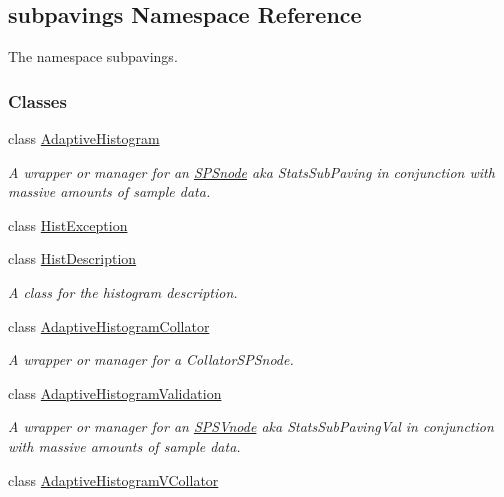 \hypertarget{namespacesubpavings}{\subsection{subpavings \-Namespace \-Reference}
\label{namespacesubpavings}
}


\-The namespace subpavings.  


\subsubsection*{\-Classes}
\begin{DoxyCompactItemize}
\item 
class \hyperlink{classsubpavings_1_1AdaptiveHistogram}{\-Adaptive\-Histogram}
\begin{DoxyCompactList}\small\item\em \-A wrapper or manager for an \hyperlink{classsubpavings_1_1SPSnode}{\-S\-P\-Snode} aka \-Stats\-Sub\-Paving in conjunction with massive amounts of sample data. \end{DoxyCompactList}\item 
class \hyperlink{classsubpavings_1_1HistException}{\-Hist\-Exception}
\item 
class \hyperlink{classsubpavings_1_1HistDescription}{\-Hist\-Description}
\begin{DoxyCompactList}\small\item\em \-A class for the histogram description. \end{DoxyCompactList}\item 
class \hyperlink{classsubpavings_1_1AdaptiveHistogramCollator}{\-Adaptive\-Histogram\-Collator}
\begin{DoxyCompactList}\small\item\em \-A wrapper or manager for a \-Collator\-S\-P\-Snode. \end{DoxyCompactList}\item 
class \hyperlink{classsubpavings_1_1AdaptiveHistogramValidation}{\-Adaptive\-Histogram\-Validation}
\begin{DoxyCompactList}\small\item\em \-A wrapper or manager for an \hyperlink{classsubpavings_1_1SPSVnode}{\-S\-P\-S\-Vnode} aka \-Stats\-Sub\-Paving\-Val in conjunction with massive amounts of sample data. \end{DoxyCompactList}\item 
class \hyperlink{classsubpavings_1_1AdaptiveHistogramVCollator}{\-Adaptive\-Histogram\-V\-Collator}

\end{DoxyCompactItemize}

